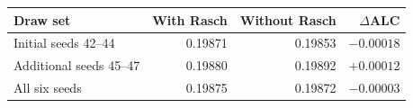 \begin{tabular}{lrrr}
\toprule
Draw set & With Rasch & Without Rasch & $\Delta$ALC\\
\midrule
Initial seeds 42--44 & 0.19871 & 0.19853 & $-0.00018$\\
Additional seeds 45--47 & 0.19880 & 0.19892 & $+0.00012$\\
All six seeds & 0.19875 & 0.19872 & $-0.00003$\\
\bottomrule
\end{tabular}
